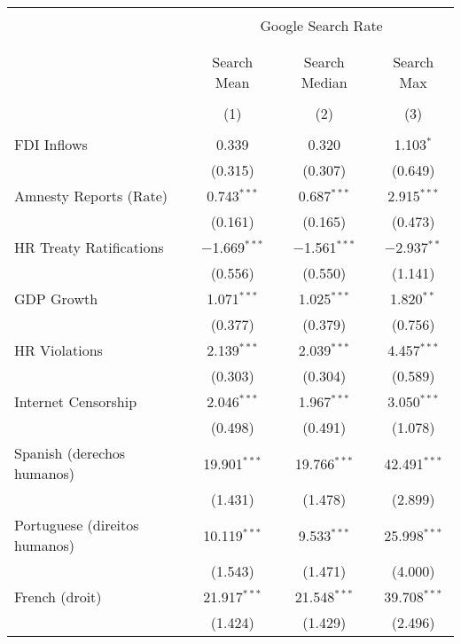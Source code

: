 
\begin{table}[!htbp] \centering 
  \caption{} 
  \label{} 
\begin{tabular}{@{\extracolsep{5pt}}lccc} 
\\[-1.8ex]\hline 
\hline \\[-1.8ex] 
 & \multicolumn{3}{c}{Google Search Rate} \\ 
\cline{2-4} 
\\[-1.8ex] & \multicolumn{3}{c}{ } \\ 
 & Search Mean & Search Median & Search Max \\ 
\\[-1.8ex] & (1) & (2) & (3)\\ 
\hline \\[-1.8ex] 
 FDI Inflows & 0.339 & 0.320 & 1.103$^{*}$ \\ 
  & (0.315) & (0.307) & (0.649) \\ 
  Amnesty Reports (Rate) & 0.743$^{***}$ & 0.687$^{***}$ & 2.915$^{***}$ \\ 
  & (0.161) & (0.165) & (0.473) \\ 
  HR Treaty Ratifications & $-$1.669$^{***}$ & $-$1.561$^{***}$ & $-$2.937$^{**}$ \\ 
  & (0.556) & (0.550) & (1.141) \\ 
  GDP Growth & 1.071$^{***}$ & 1.025$^{***}$ & 1.820$^{**}$ \\ 
  & (0.377) & (0.379) & (0.756) \\ 
  HR Violations & 2.139$^{***}$ & 2.039$^{***}$ & 4.457$^{***}$ \\ 
  & (0.303) & (0.304) & (0.589) \\ 
  Internet Censorship & 2.046$^{***}$ & 1.967$^{***}$ & 3.050$^{***}$ \\ 
  & (0.498) & (0.491) & (1.078) \\ 
  Spanish (derechos humanos) & 19.901$^{***}$ & 19.766$^{***}$ & 42.491$^{***}$ \\ 
  & (1.431) & (1.478) & (2.899) \\ 
  Portuguese (direitos humanos) & 10.119$^{***}$ & 9.533$^{***}$ & 25.998$^{***}$ \\ 
  & (1.543) & (1.471) & (4.000) \\ 
  French (droit) & 21.917$^{***}$ & 21.548$^{***}$ & 39.708$^{***}$ \\ 
  & (1.424) & (1.429) & (2.496) \\ 

\end{tabular}
\end{table}
